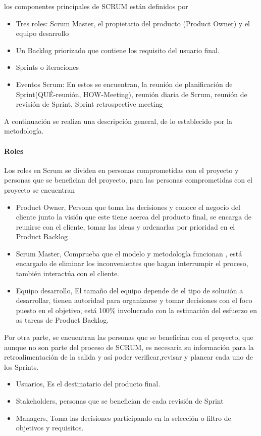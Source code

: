 los componentes principales de SCRUM están definidos por 
\begin{itemize}
    \item Tres roles: Scrum Master, el propietario del producto (Product Owner) y el equipo desarrollo
    \item Un Backlog priorizado que contiene los requisito del usuario final.
    \item Sprints o iteraciones
    \item Eventos Scrum: En estos se encuentran, la reunión de planificación de Sprint(QUÉ-reunión, HOW-Meeting), reunión diaria de Scrum, reunión de revisión de Sprint, Sprint retrospective meeting 
\end{itemize}

A continuación se realiza una descripción general, de lo establecido por la metodología. 

\paragraph{Roles}
Los roles en Scrum se dividen en personas comprometidas con el proyecto y personas que se benefician del proyecto, para las personas comprometidas con el proyecto se encuentran
\begin{itemize}
    \item Product Owner, Persona que toma las decisiones y conoce el negocio del cliente junto la visión que este tiene acerca del producto final, se encarga de reunirse con el cliente, tomar las ideas y ordenarlas por prioridad en el Product Backlog
     \item Scrum Master, Comprueba que el modelo y metodología funcionan , está encargado de eliminar los inconvenientes que hagan interrumpir el proceso, también interactúa con el cliente.
     \item Equipo desarrollo, El tamaño del equipo depende de el tipo de solución a desarrollar, tienen autoridad para organizarse y tomar decisiones con el foco puesto en el objetivo, está 100\% involucrado con la estimación del esfuerzo en as tareas de Product Backlog.
\end{itemize}

Por otra parte, se encuentran las personas que se benefician con el proyecto, que aunque no son parte del proceso de SCRUM, es necesaria su información para la retroalimentación de la salida y así poder verificar,revisar y planear cada uno de los Sprints.
\begin{itemize}
    \item Usuarios, Es el destinatario del producto final. 
    \item Stakeholders, personas que se benefician de cada revisión de Sprint
    \item Managers, Toma las decisiones participando en la selección o filtro de objetivos y requisitos. 
\end{itemize}

